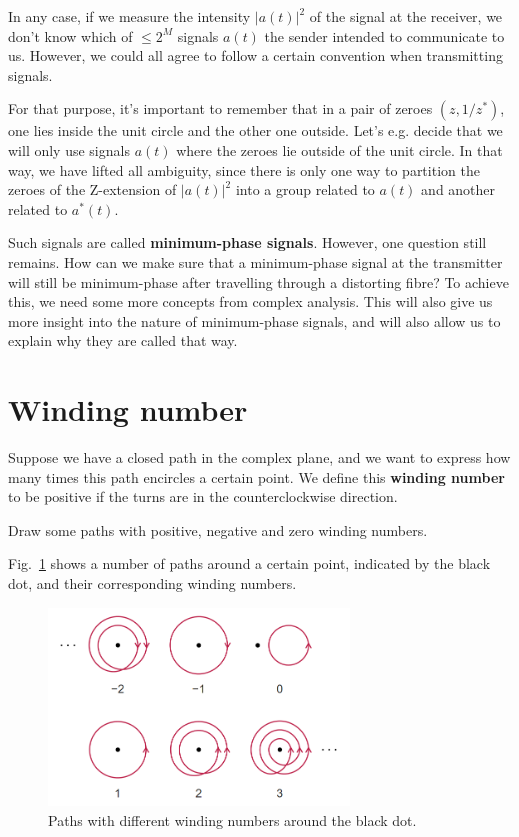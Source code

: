 In any case, if we measure the intensity $|a(t)|^2$ of the signal at the receiver, we don't know which of $\le2^M$ signals $a(t)$ the sender intended to communicate to us. However, we could all agree to follow a certain convention when transmitting signals. 

\pagebreak

For that purpose, it's important to remember that in a pair of zeroes $(z, 1/z^*)$, one lies inside the unit circle and the other one outside. Let's e.g. decide that we will only use signals $a(t)$ where the zeroes lie outside of the unit circle. In that way, we have lifted all ambiguity, since there is only one way to partition the zeroes of the Z-extension of $|a(t)|^2$ into a group related to $a(t)$ and another related to $a^*(t)$.

Such signals are called \textbf{minimum-phase signals}. However, one question still remains. How can we make sure that a minimum-phase signal at the transmitter will still be minimum-phase after travelling through a distorting fibre? To achieve this, we need some more concepts from complex analysis. This will also give us more insight into the nature of minimum-phase signals, and will also allow us to explain why they are called that way.

\pagebreak

\section{Winding number}

Suppose we have a closed path in the complex plane, and we want to express how many times this path encircles a certain point. We define this \textbf{winding number} to be positive if the turns are in the counterclockwise direction.

\begin{cue}
Draw some paths with positive, negative and zero winding numbers.    
\end{cue}

Fig.~\ref{fig-winding} shows a number of paths around a certain point, indicated by the black dot, and their corresponding winding numbers.

\begin{figure}[h]
\centering
\includegraphics[width=8cm]{kk/figures/winding_number}
\caption{Paths with different winding numbers around the black dot.}
\label{fig-winding}
\end{figure}

